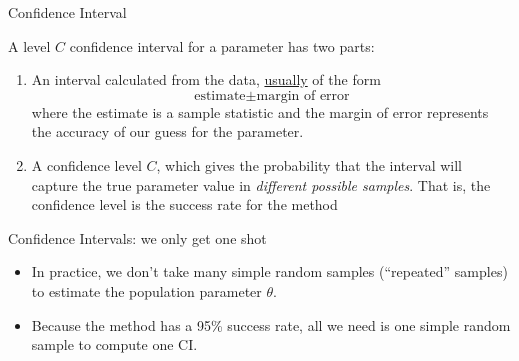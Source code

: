 \documentclass[10pt]{beamer}\usepackage[]{graphicx}\usepackage[]{color}
\begin{document}
\begin{frame}{Confidence Interval}
	
	\begin{defm}
		A level $C$ confidence interval for a parameter has two parts:
		\begin{enumerate}
			\item An interval calculated from the data, \underline{usually} of the form $$\textrm{estimate} \pm \textrm{margin of error}$$ where the estimate is a sample statistic and the margin of error represents the accuracy of our guess for the parameter.
			\item A confidence level $C$, which gives the probability that the interval will capture the true parameter value in \textit{different possible samples}. That is, the confidence level is the success rate for the method
		\end{enumerate}
	\end{defm}
	
	
\end{frame}






\begin{frame}{Confidence Intervals: we only get one shot}
	\begin{itemize}
		\setlength\itemsep{2em}
		\item In practice, we don't take many simple random samples (``repeated'' samples) to estimate the population parameter $\theta$. \pause 
		\item Because the method has a 95\% success rate, all we need is one simple random sample to compute one CI. 
	\end{itemize}
\end{frame}
\end{document}
